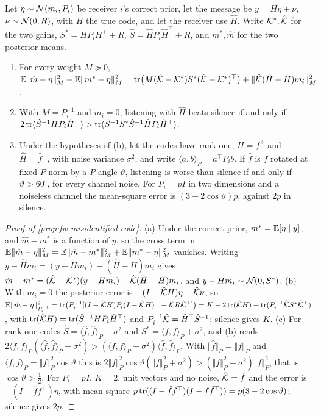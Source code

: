 \begin{proposition}\label{prop:fw-misidentified-code}
Let $\eta\sim\mathcal{N}(m_i,P_i)$ be receiver $i$'s correct prior, let the message be $y=H\eta+\nu$, $\nu\sim\mathcal{N}(0,R)$, with $H$ the true code, and let the receiver use $\hat H$. Write $\mathcal{K}^\ast,\hat{\mathcal{K}}$ for the two gains, $S^\ast=HP_iH^\top+R$, $\hat S=\hat HP_i\hat H^\top+R$, and $m^\ast,\hat m$ for the two posterior means.
\begin{enumerate}
\item[(a)] For every weight $M\succeq0$, $\mathbb{E}\Vert\hat m-\eta\Vert_M^2-\mathbb{E}\Vert m^\ast-\eta\Vert_M^2=\operatorname{tr}\bigl(M(\hat{\mathcal{K}}-\mathcal{K}^\ast)S^\ast(\hat{\mathcal{K}}-\mathcal{K}^\ast)^\top\bigr)+\Vert\hat{\mathcal{K}}(\hat H-H)m_i\Vert_M^2$.
\item[(b)] With $M=P_i^{-1}$ and $m_i=0$, listening with $\hat H$ beats silence if and only if $2\operatorname{tr}(\hat S^{-1}HP_i\hat H^\top)>\operatorname{tr}(\hat S^{-1}S^\ast\hat S^{-1}\hat HP_i\hat H^\top)$.
\item[(c)] Under the hypotheses of (b), let the codes have rank one, $H=f^\top$ and $\hat H=\hat f^\top$, with noise variance $\sigma^2$, and write $\langle a,b\rangle_P=a^\top P_ib$. If $\hat f$ is $f$ rotated at fixed $P$-norm by a $P$-angle $\vartheta$, listening is worse than silence if and only if $\vartheta>60^\circ$, for every channel noise. For $P_i=pI$ in two dimensions and a noiseless channel the mean-square error is $(3-2\cos\vartheta)p$, against $2p$ in silence.
\end{enumerate}
\end{proposition}

\begin{proof}[Proof of \cref{prop:fw-misidentified-code}]
(a) Under the correct prior, $m^\ast=\mathbb{E}[\eta\mid y]$, and $\hat m-m^\ast$ is a function of $y$, so the cross term in $\mathbb{E}\Vert\hat m-\eta\Vert^2_M=\mathbb{E}\Vert\hat m-m^\ast\Vert^2_M+\mathbb{E}\Vert m^\ast-\eta\Vert^2_M$ vanishes. Writing $y-\hat Hm_i=(y-Hm_i)-(\hat H-H)m_i$ gives $\hat m-m^\ast=(\hat{\mathcal{K}}-\mathcal{K}^\ast)(y-Hm_i)-\hat{\mathcal{K}}(\hat H-H)m_i$, and $y-Hm_i\sim\mathcal{N}(0,S^\ast)$. (b) With $m_i=0$ the posterior error is $-(I-\hat{\mathcal{K}} H)\eta+\hat{\mathcal{K}}\nu$, so $\mathbb{E}\Vert\hat m-\eta\Vert^2_{P_i^{-1}}=\operatorname{tr}\bigl(P_i^{-1}[(I-\hat{\mathcal{K}} H)P_i(I-\hat{\mathcal{K}} H)^\top+\hat{\mathcal{K}} R\hat{\mathcal{K}}^\top]\bigr)=K-2\operatorname{tr}(\hat{\mathcal{K}} H)+\operatorname{tr}(P_i^{-1}\hat{\mathcal{K}} S^\ast\hat{\mathcal{K}}^\top)$, with $\operatorname{tr}(\hat{\mathcal{K}} H)=\operatorname{tr}(\hat S^{-1}HP_i\hat H^\top)$ and $P_i^{-1}\hat{\mathcal{K}}=\hat H^\top\hat S^{-1}$; silence gives $K$. (c) For rank-one codes $\hat S=\langle\hat f,\hat f\rangle_P+\sigma^2$ and $S^\ast=\langle f,f\rangle_P+\sigma^2$, and (b) reads $2\langle f,\hat f\rangle_P(\langle\hat f,\hat f\rangle_P+\sigma^2)>(\langle f,f\rangle_P+\sigma^2)\langle\hat f,\hat f\rangle_P$. With $\Vert\hat f\Vert_P=\Vert f\Vert_P$ and $\langle f,\hat f\rangle_P=\Vert f\Vert_P^2\cos\vartheta$ this is $2\Vert f\Vert_P^2\cos\vartheta(\Vert f\Vert_P^2+\sigma^2)>(\Vert f\Vert_P^2+\sigma^2)\Vert f\Vert_P^2$, that is $\cos\vartheta>\tfrac12$. For $P_i=pI$, $K=2$, unit vectors and no noise, $\hat{\mathcal{K}}=\hat f$ and the error is $-(I-\hat ff^\top)\eta$, with mean square $p\operatorname{tr}((I-\hat ff^\top)(I-f\hat f^\top))=p(3-2\cos\vartheta)$; silence gives $2p$.
\end{proof}

